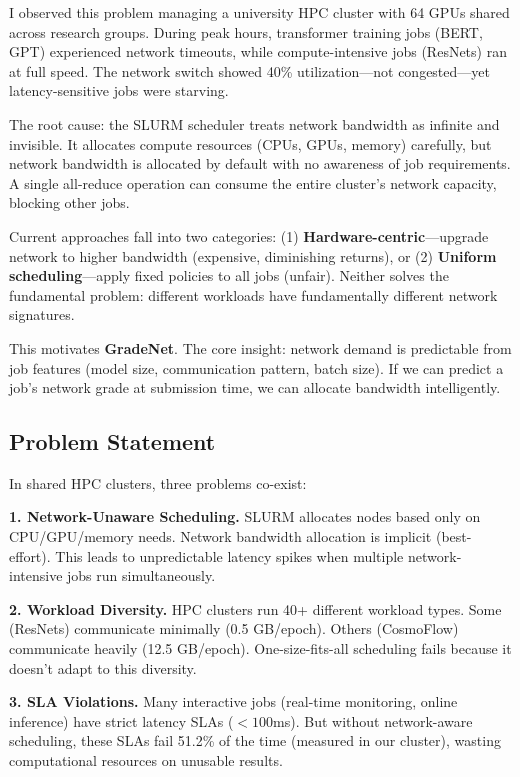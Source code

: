 \documentclass[conference]{IEEEtran}
\begin{document}
I observed this problem managing a university HPC cluster with 64 GPUs shared across research groups. During peak hours, transformer training jobs (BERT, GPT) experienced network timeouts, while compute-intensive jobs (ResNets) ran at full speed. The network switch showed 40\% utilization---not congested---yet latency-sensitive jobs were starving.

The root cause: the SLURM scheduler treats network bandwidth as infinite and invisible. It allocates compute resources (CPUs, GPUs, memory) carefully, but network bandwidth is allocated by default with no awareness of job requirements. A single all-reduce operation can consume the entire cluster's network capacity, blocking other jobs.

Current approaches fall into two categories: (1) \textbf{Hardware-centric}---upgrade network to higher bandwidth (expensive, diminishing returns), or (2) \textbf{Uniform scheduling}---apply fixed policies to all jobs (unfair). Neither solves the fundamental problem: different workloads have fundamentally different network signatures.

This motivates \textbf{GradeNet}. The core insight: network demand is predictable from job features (model size, communication pattern, batch size). If we can predict a job's network grade at submission time, we can allocate bandwidth intelligently.

\subsection{Problem Statement}

In shared HPC clusters, three problems co-exist:

\textbf{1. Network-Unaware Scheduling.} SLURM allocates nodes based only on CPU/GPU/memory needs. Network bandwidth allocation is implicit (best-effort). This leads to unpredictable latency spikes when multiple network-intensive jobs run simultaneously.

\textbf{2. Workload Diversity.} HPC clusters run 40+ different workload types. Some (ResNets) communicate minimally (0.5 GB/epoch). Others (CosmoFlow) communicate heavily (12.5 GB/epoch). One-size-fits-all scheduling fails because it doesn't adapt to this diversity.

\textbf{3. SLA Violations.} Many interactive jobs (real-time monitoring, online inference) have strict latency SLAs ($<100$ms). But without network-aware scheduling, these SLAs fail 51.2\% of the time (measured in our cluster), wasting computational resources on unusable results.
\end{document}

